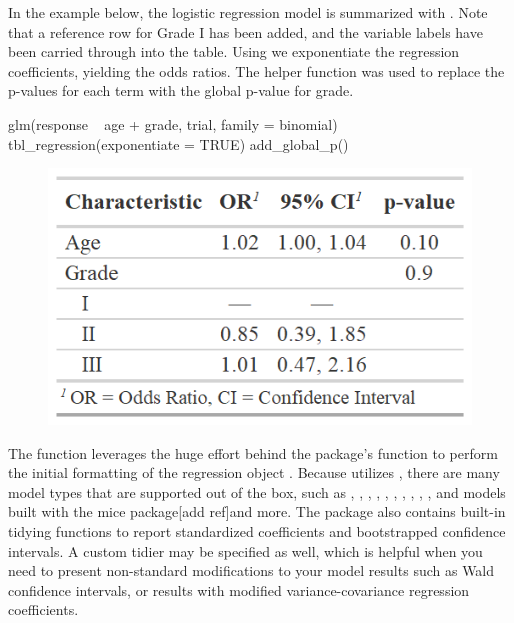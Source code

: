 In the example below, the logistic regression model is summarized with .
Note that a reference row for Grade I has been added, and the variable labels have been carried through into the table.
Using   we exponentiate the regression coefficients, yielding the odds ratios.
The helper function  was used to replace the p-values for each term with the global p-value for grade.

\begin{example}
glm(response ~ age + grade, trial, family = binomial) %
  tbl_regression(exponentiate = TRUE) %
  add_global_p()
\end{example}

\begin{figure}[h!]
  \includegraphics[scale=0.49]{regression.png}
  \centering
\end{figure}

The  function leverages the huge effort behind the  package's  function to perform the initial formatting of the regression object \citep{broom}.
Because  utilizes , there are many model types that are supported out of the box, such as , , , , , , , , , , and models built with the mice package[add ref]and more. The  package also contains built-in tidying functions to report standardized coefficients and bootstrapped confidence intervals.
A custom tidier may be specified as well, which is helpful when you need to present non-standard modifications to your model results such as Wald confidence intervals, or results with modified variance-covariance regression coefficients.

